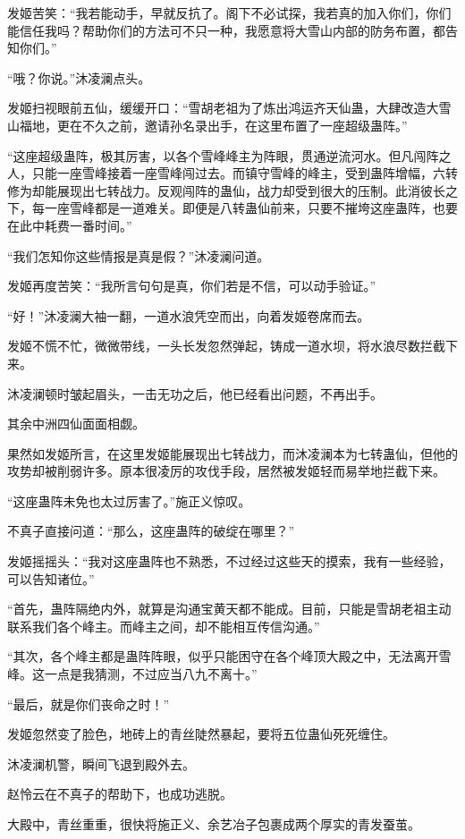 \begin{this_body}
发姬苦笑：“我若能动手，早就反抗了。阁下不必试探，我若真的加入你们，你们能信任我吗？帮助你们的方法可不只一种，我愿意将大雪山内部的防务布置，都告知你们。”

“哦？你说。”沐凌澜点头。

发姬扫视眼前五仙，缓缓开口：“雪胡老祖为了炼出鸿运齐天仙蛊，大肆改造大雪山福地，更在不久之前，邀请孙名录出手，在这里布置了一座超级蛊阵。”

“这座超级蛊阵，极其厉害，以各个雪峰峰主为阵眼，贯通逆流河水。但凡闯阵之人，只能一座雪峰接着一座雪峰闯过去。而镇守雪峰的峰主，受到蛊阵增幅，六转修为却能展现出七转战力。反观闯阵的蛊仙，战力却受到很大的压制。此消彼长之下，每一座雪峰都是一道难关。即便是八转蛊仙前来，只要不摧垮这座蛊阵，也要在此中耗费一番时间。”

“我们怎知你这些情报是真是假？”沐凌澜问道。

发姬再度苦笑：“我所言句句是真，你们若是不信，可以动手验证。”

“好！”沐凌澜大袖一翻，一道水浪凭空而出，向着发姬卷席而去。

发姬不慌不忙，微微带线，一头长发忽然弹起，铸成一道水坝，将水浪尽数拦截下来。

沐凌澜顿时皱起眉头，一击无功之后，他已经看出问题，不再出手。

其余中洲四仙面面相觑。

果然如发姬所言，在这里发姬能展现出七转战力，而沐凌澜本为七转蛊仙，但他的攻势却被削弱许多。原本很凌厉的攻伐手段，居然被发姬轻而易举地拦截下来。

“这座蛊阵未免也太过厉害了。”施正义惊叹。

不真子直接问道：“那么，这座蛊阵的破绽在哪里？”

发姬摇摇头：“我对这座蛊阵也不熟悉，不过经过这些天的摸索，我有一些经验，可以告知诸位。”

“首先，蛊阵隔绝内外，就算是沟通宝黄天都不能成。目前，只能是雪胡老祖主动联系我们各个峰主。而峰主之间，却不能相互传信沟通。”

“其次，各个峰主都是蛊阵阵眼，似乎只能困守在各个峰顶大殿之中，无法离开雪峰。这一点是我猜测，不过应当八九不离十。”

“最后，就是你们丧命之时！”

发姬忽然变了脸色，地砖上的青丝陡然暴起，要将五位蛊仙死死缠住。

沐凌澜机警，瞬间飞退到殿外去。

赵怜云在不真子的帮助下，也成功逃脱。

大殿中，青丝重重，很快将施正义、余艺冶子包裹成两个厚实的青发蚕茧。


\end{this_body}

